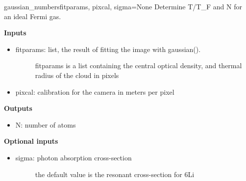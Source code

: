 \documentclass[letterpaper,10pt,english]{manual}
\begin{document}
\hypertarget{odysseus.fitfuncs.gaussian_numbers}{}\begin{funcdesc}{gaussian\_numbers}{fitparams, pixcal, sigma=None}
Determine T/T\_F and N for an ideal Fermi gas.

\textbf{Inputs}
\begin{itemize}
\item {} \begin{description}
\item[fitparams: list, the result of fitting the image with gaussian().] \leavevmode
fitparams is a list containing the central optical density,
and thermal radius of the cloud in pixels

\end{description}

\item {} 
pixcal: calibration for the camera in meters per pixel

\end{itemize}

\textbf{Outputs}
\begin{itemize}
\item {} 
N: number of atoms

\end{itemize}

\textbf{Optional inputs}
\begin{itemize}
\item {} \begin{description}
\item[sigma: photon absorption cross-section] \leavevmode
the default value is the resonant cross-section for 6Li

\end{description}

\end{itemize}
\end{funcdesc}
\end{document}
